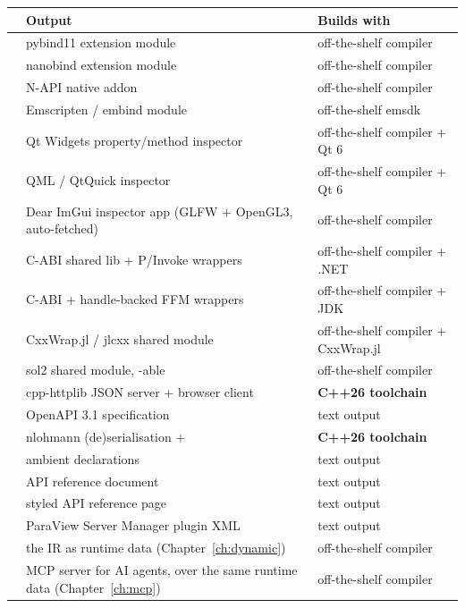 \begin{center}
\small
\begin{longtable}{@{}lL{5.4cm}L{4.6cm}@{}}
\toprule
\textbf{} & \textbf{Output} & \textbf{Builds with} \\
\midrule
\endhead
{}     & pybind11 extension module & off-the-shelf compiler \\
   & nanobind extension module & off-the-shelf compiler \\
       & N-API native addon & off-the-shelf compiler \\
       & Emscripten / embind module & off-the-shelf emsdk \\
         & Qt Widgets property/method inspector & off-the-shelf compiler + Qt 6 \\
        & QML / QtQuick inspector & off-the-shelf compiler + Qt 6 \\
      & Dear ImGui inspector app (GLFW + OpenGL3, auto-fetched) & off-the-shelf compiler \\
     & C-ABI shared lib + P/Invoke wrappers & off-the-shelf compiler + .NET \\
       & C-ABI + handle-backed FFM wrappers & off-the-shelf compiler + JDK \\
      & CxxWrap.jl / jlcxx shared module & off-the-shelf compiler + CxxWrap.jl \\
        & sol2 shared module, -able & off-the-shelf compiler \\
       & cpp-httplib JSON server + browser client & \textbf{C++26 toolchain} \\
    & OpenAPI 3.1 specification & text output \\
       & nlohmann (de)serialisation +  & \textbf{C++26 toolchain} \\
 & ambient  declarations & text output \\
   & API reference document & text output \\
       & styled API reference page & text output \\
   & ParaView Server Manager plugin XML & text output \\
    & the IR as runtime data (Chapter~\ref{ch:dynamic}) & off-the-shelf compiler \\
        & MCP server for AI agents, over the same runtime data
  (Chapter~\ref{ch:mcp}) & off-the-shelf compiler \\
\bottomrule
\end{longtable}
\end{center}

